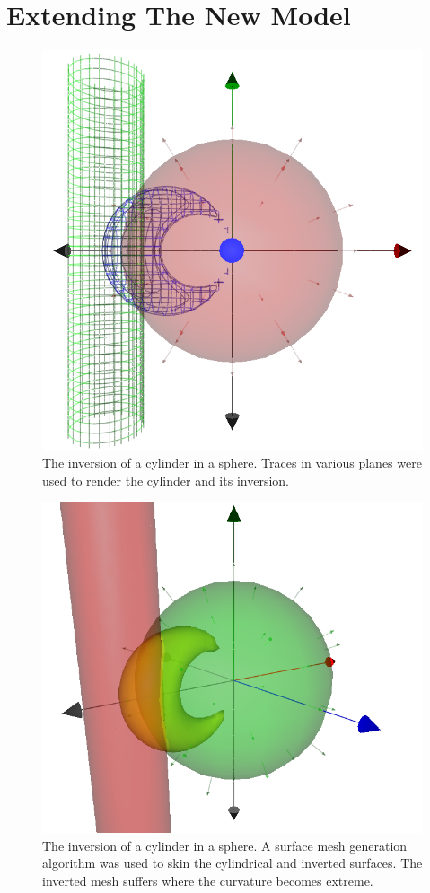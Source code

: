 \documentclass{birkjour}
\theoremstyle{definition}
\theoremstyle{remark}
\numberwithin{equation}{section}
\begin{document}
\section{Extending The New Model}

\begin{figure}
\includegraphics[scale=0.3]{InvertCylinderInSphereWire}
\caption{The inversion of a cylinder in a sphere.  Traces in various planes were
used to render the cylinder and its inversion.}
\label{fig_invert_cylinder_in_sphere_wire}
\end{figure}
\begin{figure}
\includegraphics[scale=0.3]{InvertCylinderInSphereSolid}
\caption{The inversion of a cylinder in a sphere.  A surface mesh generation
algorithm was used to skin the cylindrical and inverted surfaces.  The inverted
mesh suffers where the curvature becomes extreme.}
\label{fig_invert_cylinder_in_sphere_solid}
\end{figure}
\end{document}

